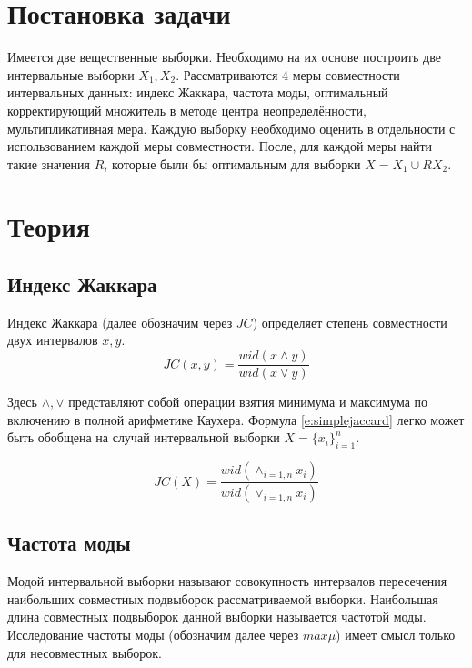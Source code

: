 \documentclass[a4paper,12pt]{article}
\begin{document}

\newpage

\tableofcontents
\listoffigures
\newpage

\section{Постановка задачи}
\quad Имеется две вещественные выборки.
Необходимо на их основе построить две интервальные выборки $ X_{1}, X_{2} $.
Рассматриваются 4 меры совместности интервальных данных: индекс Жаккара,
частота моды, оптимальный корректирующий множитель в методе центра
неопределённости, мультипликативная мера.
Каждую выборку необходимо оценить в отдельности с использованием
каждой меры совместности. После, для каждой меры найти такие значения $ R $,
которые были бы оптимальным для выборки $ X = X_{1} \cup R X_{2} $.

\section{Теория}
\subsection{Индекс Жаккара}
\quad Индекс Жаккара (далее обозначим через $ JC $) определяет степень
совместности двух интервалов $ x, y $.
\begin{equation}
  JC(x, y) = \frac{wid(x \land y)}{wid(x \lor y)}
  \label{e:simplejaccard}
\end{equation}

Здесь $\land, \lor$ представляют собой операции взятия минимума и
максимума по включению в полной арифметике Каухера.
Формула \ref{e:simplejaccard} легко может быть обобщена на случай
интервальной выборки $ X = \{x_i\}_{i=1}^{n} $.

\begin{equation}
  JC(X) = \frac{wid(\land_{i=1,n}x_i)}{wid(\lor_{i=1,n}x_i)}
  \label{e:jaccard}
\end{equation}

\subsection{Частота моды}
\quad Модой интервальной выборки называют совокупность интервалов
пересечения наибольших совместных подвыборок рассматриваемой
выборки. Наибольшая длина совместных подвыборок данной выборки называется
частотой моды. Исследование частоты моды (обозначим далее через
$ max\mu $) имеет смысл только для несовместных выборок.
\end{document}
